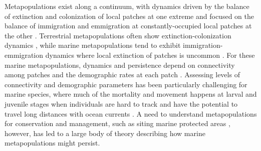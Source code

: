 \documentclass[12pt, oneside]{article}   	%
\begin{document}
Metapopulations exist along a continuum, with dynamics driven by the balance of extinction and colonization of local patches at one extreme and focused on the balance of immigration and emmigration at constantly-occupied local patches at the other \citep{kritzer2006marine}. Terrestrial metapopulations often show extinction-colonization dynamics \citep[e.g.][]{hanski1998metapopulation}, while marine metapopulations tend to exhibit immigration-emmigration dynamics where local extinction of patches is uncommon \citep{kritzer2006marine}. For these marine metapopulations, dynamics and persistence depend on connectivity among patches and the demographic rates at each patch \citep[e.g.][]{hastings_persistence_2006, hanski1998metapopulation}. Assessing levels of connectivity and demographic parameters has been particularly challenging for marine species, where much of the mortality and movement happens at larval and juvenile stages when individuals are hard to track and have the potential to travel long distances with ocean currents \citep[e.g.][]{kritzer2006marine, cowen_larval_2009, roughgarden_recruitment_1988}. A need to understand metapopulations for conservation and management, such as siting marine protected areas \citep[e.g.][]{botsford_dependence_2001,white_population_2010}, however, has led to a large body of theory describing how marine metapopulations might persist. 

\end{document}
